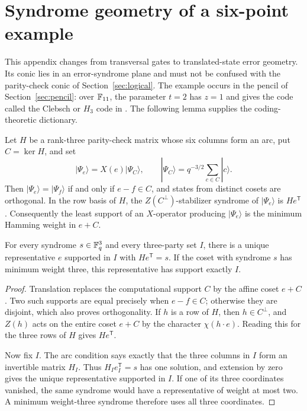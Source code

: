 \section{Syndrome geometry of a six-point example}
\label{sec:six-point-example}

This appendix changes from transversal gates to translated-state error
geometry.  Its conic lies in an error-syndrome plane and must not be confused
with the parity-check conic of Section~\ref{sec:logical}.  The example occurs
in the pencil of Section~\ref{sec:pencil}: over \(\mathbb F_{11}\), the parameter
\(t=2\) has \(z=1\) and gives the code called the Clebsch or \(H_3\) code in
\cite{RuddClebsch2026}.  The following lemma supplies the coding-theoretic
dictionary.

\begin{lemma}
\label{lem:coset-syndrome-charts}
Let \(H\) be a rank-three parity-check matrix whose six columns form an
arc, put \(C=\ker H\), and set
\[
 |\Psi_e\rangle=X(e)|\Psi_C\rangle,
 \qquad
 |\Psi_C\rangle=q^{-3/2}\sum_{c\in C}|c\rangle .
\]
Then \(|\Psi_e\rangle=|\Psi_f\rangle\) if and only if \(e-f\in C\),
and states from distinct cosets are orthogonal.  In the row basis of
\(H\), the \(Z(C^\perp)\)-stabilizer syndrome of
\(|\Psi_e\rangle\) is \(He^{\mathsf T}\).
Consequently the least support of an \(X\)-operator producing
\(|\Psi_e\rangle\) is the minimum Hamming weight in \(e+C\).

For every syndrome \(s\in\mathbb F_q^3\) and every three-party set \(I\),
there is a unique representative \(e\) supported in \(I\) with
\(He^{\mathsf T}=s\).  If the coset with syndrome \(s\) has minimum
weight three, this representative has support exactly \(I\).
\end{lemma}

\begin{proof}
Translation replaces the computational support \(C\) by the affine coset
\(e+C\).  Two such supports are equal precisely when \(e-f\in C\);
otherwise they are disjoint, which also proves orthogonality.  If \(h\) is
a row of \(H\), then \(h\in C^\perp\), and \(Z(h)\) acts on the entire
coset \(e+C\) by the character \(\chi(h\mathbin\cdot e)\).  Reading this
for the three rows of \(H\) gives \(He^{\mathsf T}\).

Now fix \(I\).  The arc condition says exactly that the three columns in
\(I\) form an invertible matrix \(H_I\).  Thus
\(H_Ie_I^{\mathsf T}=s\) has one solution, and extension by zero gives
the unique representative supported in \(I\).  If one of its three
coordinates vanished, the same syndrome would have a representative of
weight at most two.  A minimum weight-three syndrome therefore uses all
three coordinates.
\end{proof}

